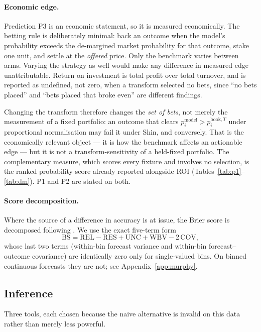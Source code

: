 \documentclass[11pt,a4paper]{article}
\begin{document}
\paragraph{Economic edge.} Prediction P3 is an economic statement, so it is
measured economically. The betting rule is deliberately minimal: back an
outcome when the model's probability exceeds the de-margined market probability
for that outcome, stake one unit, and settle at the \emph{offered} price. Only
the benchmark varies between arms. Varying the strategy as well would make any
difference in measured edge unattributable. Return on investment is total
profit over total turnover, and is reported as undefined, not zero, when a
transform selected no bets, since ``no bets placed'' and ``bets placed that
broke even'' are different findings.

Changing the transform therefore changes the \emph{set of bets}, not merely
the measurement of a fixed portfolio: an outcome that clears
$p_i^{\mathrm{model}} > p_i^{\mathrm{book},T}$ under proportional
normalisation may fail it under Shin, and conversely. That is the
economically relevant object --- it is how the benchmark affects an
actionable edge --- but it is not a transform-sensitivity of a held-fixed
portfolio. The complementary measure, which scores every fixture and
involves no selection, is the ranked probability score already reported
alongside ROI (Tables~\ref{tab:p1}--\ref{tab:dm}). P1 and P2 are stated on
both.

\paragraph{Score decomposition.} Where the source of a difference in accuracy
is at issue, the Brier score is decomposed following \citet{murphy1973}. We use
the exact five-term form
\begin{equation}
  \mathrm{BS} = \mathrm{REL} - \mathrm{RES} + \mathrm{UNC}
              + \mathrm{WBV} - 2\,\mathrm{COV},
\end{equation}
whose last two terms (within-bin forecast variance and within-bin
forecast--outcome covariance) are identically zero only for single-valued
bins. On binned continuous forecasts they are not; see
Appendix~\ref{app:murphy}.

\subsection{Inference}
\label{sec:inference}

Three tools, each chosen because the naive alternative is invalid on this data
rather than merely less powerful.
\end{document}
